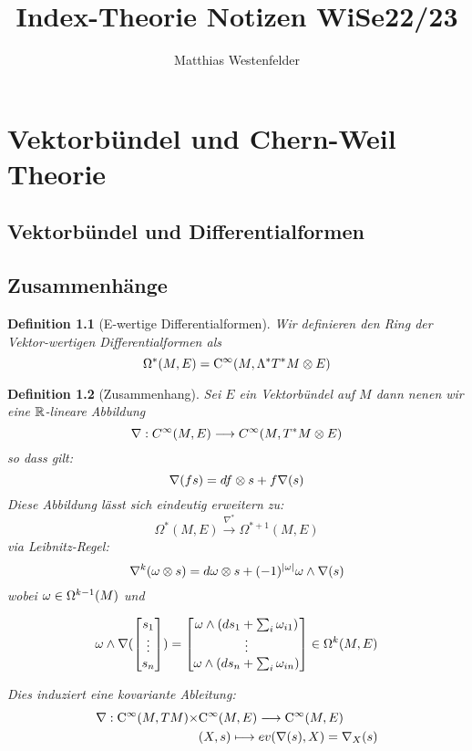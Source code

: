 \documentclass{report}
\title{Index-Theorie Notizen WiSe22/23}
\author{Matthias Westenfelder}
\date{}
\newtheorem{Def}{Definition}[chapter]
\begin{document}
\maketitle
\tableofcontents

\chapter{Vektorbündel und Chern-Weil Theorie}
\section{Vektorbündel und Differentialformen}

\section{Zusammenhänge}

\begin{Def}[E-wertige Differentialformen]
    Wir definieren den Ring der Vektor-wertigen Differentialformen als
    $$\Omega^*(M,E) = \mathrm{C}^\infty(M,\Lambda^* T^*M \otimes E)$$
\end{Def}

\begin{Def}[Zusammenhang]
    Sei $E$ ein Vektorbündel auf $M$ dann nenen wir eine $\mathbb{R}$-lineare Abbildung
    $$\nabla: C^\infty(M , E) \longrightarrow C^\infty( M ,T^*M \otimes E )$$
    so dass gilt: 
    $$\nabla(fs) = df \otimes s + f \nabla(s)$$
    Diese Abbildung lässt sich eindeutig erweitern zu:
    $$\Omega^*(M,E) \xrightarrow{\nabla^*} \Omega^{*+1}(M,E)$$
    via Leibnitz-Regel:
    $$\nabla^k(\omega \otimes s) = d\omega \otimes s + (-1)^{|\omega|} \omega \wedge \nabla(s)$$
    wobei $\omega \in \Omega^{k-1}(M)$ und 
    
    $$\omega \wedge \nabla(\begin{bmatrix} s_1\\ \vdots\\ s_n \end{bmatrix}) = 
    \begin{bmatrix} 
        \omega \wedge (ds_1 + \sum_{i} \omega_{i1}) \\ 
        \vdots \\
        \omega \wedge (ds_n + \sum_{i} \omega_{in}) 
         \end{bmatrix} \in \Omega^k(M,E)$$

    Dies induziert eine kovariante Ableitung:
    \begin{align*}
        \nabla:\mathrm{C}^\infty(M,TM) \times& \mathrm{C}^\infty(M,E) \longrightarrow \mathrm{C}^\infty(M,E) \\
        &(X,s) \longmapsto ev(\nabla(s),X) = \nabla_X(s)
    \end{align*}
\end{Def}
\end{document}
